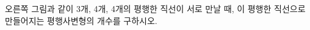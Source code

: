 \noindent\begin{minipage}[t]{0.58\linewidth}\vspace{0pt}\raggedright 오른쪽 그림과 같이 3개, 4개, 4개의 평행한 직선이 서로 만날 때, 이 평행한 직선으로 만들어지는 평행사변형의 개수를 구하시오.\end{minipage}\hfill\begin{minipage}[t]{0.4\linewidth}\vspace{0pt}\centering \resizebox{\ifdim\width>\linewidth\linewidth\else\width\fi}{!}{}\end{minipage}\par
